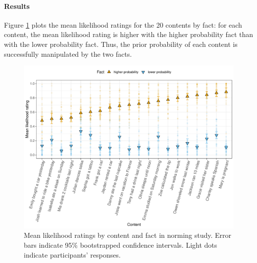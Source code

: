 \documentclass[11pt,fleqn]{article}
\newcommand{\6}{\mbox{$[\hspace*{-.6mm}[$}}
\newcommand{\9}{\mbox{$]\hspace*{-.6mm}]$}}
\begin{document}
\paragraph{Results} Figure \ref{f-prior} plots the mean likelihood ratings for the 20 contents by fact: for each content, the mean likelihood rating is higher with the higher probability fact than with the lower probability fact. Thus, the prior probability of each content is successfully manipulated by the two facts.

\begin{figure}[H]
\centering

\includegraphics[width=.75\paperwidth]{../../results/1-prior/graphs/ratings-for-CCs-identified-by-clause}

\caption{Mean likelihood ratings by content and fact in norming study. Error bars indicate 95\% bootstrapped confidence intervals. Light dots indicate participants' responses.}
\label{f-prior}
\end{figure}



\end{document}
